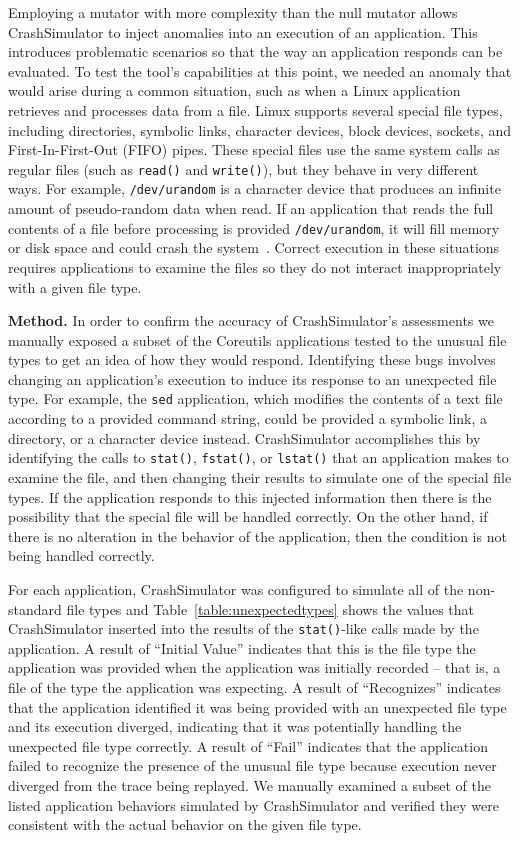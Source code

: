 Employing a mutator
with more complexity than the null mutator
allows CrashSimulator to inject anomalies into an execution
of an application.
This introduces problematic scenarios
so that the way an application responds
can be evaluated.
To test
the tool's capabilities
at this point,
we needed an anomaly
that would arise during a common situation,
such as when a Linux application retrieves
and processes data from a file.
Linux supports
several special file types,
including
directories,
symbolic links,
character devices,
block devices,
sockets, and
First-In-First-Out (FIFO) pipes.
These special files
use the same system calls
as regular files
(such as {\tt read()} and {\tt write()}),
but they behave in very different ways.
For example,
{\tt /dev/urandom} is a character device
that produces an infinite amount
of pseudo-random data
when read.
If an application that reads the full
contents of a file before processing is provided {\tt /dev/urandom}, it
will fill memory or disk space and could
crash the system~\cite{YumAptEndless}.
Correct execution in these situations
requires applications
to examine the files so they do not
interact inappropriately with a given file type.

{\bf Method.} In order to confirm the accuracy of CrashSimulator's assessments we manually
exposed a subset of the Coreutils applications tested to the unusual file
types to get an idea of how they would respond.
Identifying these bugs involves changing an application's
execution to induce its response to an unexpected file type.  For
example, the {\tt sed} application, which modifies the contents of a text
file according to a provided command string, could be provided a symbolic
link, a directory, or a character device instead.  CrashSimulator
accomplishes this by identifying the calls to {\tt stat()}, {\tt fstat()},
or {\tt lstat()} that an application makes to examine the file, and then
changing their results to simulate
one of the special file types.  If the application responds to
this injected information then there is the possibility that the special
file will be handled correctly.  On the other hand, if there is no
alteration in the behavior of the application,  then the condition is not
being handled correctly.

For each application,
CrashSimulator was configured to simulate all of the non-standard file
types and
Table~\ref{table:unexpectedtypes} shows the values that CrashSimulator
inserted into the results of the {\tt stat()}-like calls made by the
application.
A result of ``Initial Value'' indicates
that this is the file type the application was provided
when the application was initially recorded -- that is,
a file of the type the application was expecting.
A result of ``Recognizes'' indicates that the application
identified it was being provided with an unexpected file type and its
execution diverged,
indicating that it was potentially handling the
unexpected file type correctly.
A result of ``Fail'' indicates that the
application failed to recognize the presence of the unusual file type
because execution never diverged from the trace being replayed.
We manually examined a subset of the listed application behaviors simulated by
CrashSimulator and verified they were consistent with the actual behavior
on the given file type.

